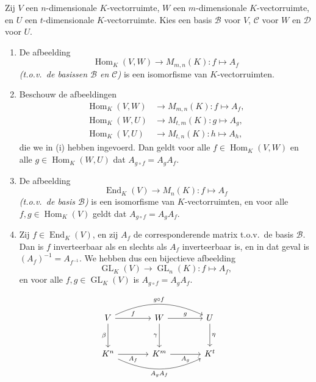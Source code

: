 \begin{stelling}[4.1.8]
    Zij $V$ een $n$-dimensionale $K$-vectorruimte, $W$ een $m$-dimensionale $K$-vectorruimte, en $U$ een $t$-dimensionale $K$-vectorruimte. Kies een basis $\mathcal{B}$ voor $V$, $\mathcal{C}$ voor $W$ en $\mathcal{D}$ voor $U$.
    \begin{enumerate}
        \item[(i)] De afbeelding
        \[ \operatorname{Hom}_K(V, W) \to M_{m,n}(K) \colon f \mapsto A_f \]
        \emph{(t.o.v.\ de basissen $\mathcal{B}$ en $\mathcal{C}$)} is een isomorfisme van $K$-vectorruimten.
        \item[(ii)] Beschouw de afbeeldingen
        \begin{align*}
            \operatorname{Hom}_K(V, W) &\to M_{m,n}(K) \colon f \mapsto A_f, \\
            \operatorname{Hom}_K(W, U) &\to M_{t,m}(K) \colon g \mapsto A_g, \\
            \operatorname{Hom}_K(V, U) &\to M_{t,n}(K) \colon h \mapsto A_h,
        \end{align*}
        die we in (i) hebben ingevoerd. Dan geldt voor alle $f \in \operatorname{Hom}_K(V, W)$ en alle $g \in \operatorname{Hom}_K(W, U)$ dat $A_{g \circ f} = A_g A_f$.
        \item[(iii)] De afbeelding
        \[ \operatorname{End}_K(V) \to M_n(K) \colon f \mapsto A_f \]
        \emph{(t.o.v.\ de basis $\mathcal{B}$)} is een isomorfisme van $K$-vectorruimten, en voor alle $f, g \in \operatorname{Hom}_K(V)$ geldt dat $A_{g \circ f} = A_g A_f$.
        \item[(iv)] Zij $f \in \operatorname{End}_K(V)$, en zij $A_f$ de corresponderende matrix t.o.v.\ de basis $\mathcal{B}$. Dan is $f$ inverteerbaar als en slechts als $A_f$ inverteerbaar is, en in dat geval is $(A_f)^{-1} = A_{f^{-1}}$. We hebben dus een bijectieve afbeelding
        \[ \operatorname{GL}_K(V) \to \operatorname{GL}_n(K) \colon f \mapsto A_f, \]
        en voor alle $f, g \in \operatorname{GL}_K(V)$ is $A_{g \circ f} = A_g A_f$.
    \end{enumerate}
\end{stelling}
\begin{equation*}
\begin{tikzcd}[row sep=large, column sep=large]
    V \arrow[r, "f"] \arrow[d, "\beta"'] \arrow[rr, "g \circ f", bend left=25] & 
    W \arrow[r, "g"] \arrow[d, "\gamma"'] & 
    U \arrow[d, "\eta"] \\
    K^n \arrow[r, "A_f"'] \arrow[rr, "A_g A_f"', bend right=25] & 
    K^m \arrow[r, "A_g"'] & 
    K^t
\end{tikzcd}
\end{equation*}
